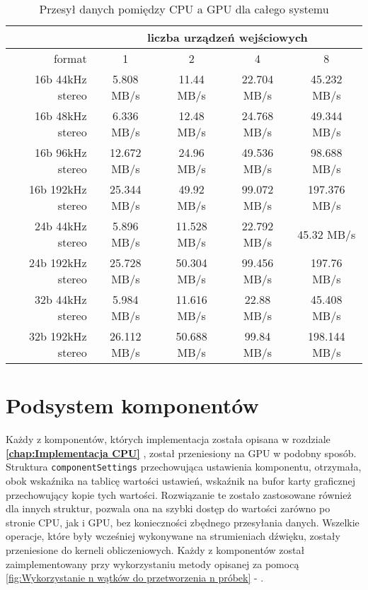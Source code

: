 \begin{table}[H]
    \begin{center}
        \caption{Przesył danych pomiędzy CPU a GPU dla całego systemu}
        \label{tab:Przesył danych pomiędzy CPU a GPU dla całego systemu}
        \begin{tabular}{r|c|c|c|c}
                               & \multicolumn{4}{c}{liczba urządzeń wejściowych}        \\
            \hline
            format             &     1       &     2      &      4      &     8         \\
            \hline
            16b 44kHz stereo   & 5.808 MB/s  & 11.44 MB/s & 22.704 MB/s & 45.232 MB/s   \\
            16b 48kHz stereo   & 6.336 MB/s  & 12.48 MB/s & 24.768 MB/s & 49.344 MB/s   \\
            16b 96kHz stereo   & 12.672 MB/s & 24.96 MB/s & 49.536 MB/s & 98.688 MB/s   \\
            16b 192kHz stereo  & 25.344 MB/s & 49.92 MB/s & 99.072 MB/s & 197.376 MB/s  \\
            \hline
            24b 44kHz stereo   & 5.896 MB/s  & 11.528 MB/s & 22.792 MB/s & 45.32 MB/s   \\
            24b 192kHz stereo  & 25.728 MB/s & 50.304 MB/s & 99.456 MB/s & 197.76 MB/s  \\
            \hline
            32b 44kHz stereo   & 5.984 MB/s  & 11.616 MB/s & 22.88 MB/s & 45.408 MB/s   \\
            32b 192kHz stereo  & 26.112 MB/s & 50.688 MB/s & 99.84 MB/s & 198.144 MB/s  \\
        \end{tabular}
    \end{center}
\end{table}


\section{Podsystem komponentów}

Każdy z komponentów, których implementacja została opisana w rozdziale \textbf{\ref{chap:Implementacja CPU} }, został przeniesiony na GPU w podobny sposób. Struktura \texttt{componentSettings} przechowująca ustawienia komponentu, otrzymała, obok wskaźnika na tablicę wartości ustawień, wskaźnik na bufor karty graficznej przechowujący kopie tych wartości. Rozwiązanie te zostało zastosowane również dla innych struktur, pozwala ona na szybki dostęp do wartości zarówno po stronie CPU, jak i GPU, bez konieczności zbędnego przesyłania danych. Wszelkie operacje, które były wcześniej wykonywane na strumieniach dźwięku, zostały przeniesione do kerneli obliczeniowych. Każdy z komponentów został zaimplementowany przy wykorzystaniu metody opisanej za pomocą \ref{fig:Wykorzystanie n wątków do przetworzenia n próbek} - . 

